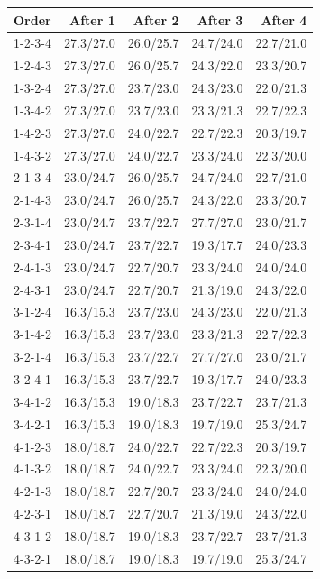 \begin{tabular}{lrrrr}
\toprule
Order & After 1 & After 2 & After 3 & After 4 \\
\midrule
1-2-3-4 & 27.3/27.0 & 26.0/25.7 & 24.7/24.0 & 22.7/21.0 \\
1-2-4-3 & 27.3/27.0 & 26.0/25.7 & 24.3/22.0 & 23.3/20.7 \\
1-3-2-4 & 27.3/27.0 & 23.7/23.0 & 24.3/23.0 & 22.0/21.3 \\
1-3-4-2 & 27.3/27.0 & 23.7/23.0 & 23.3/21.3 & 22.7/22.3 \\
1-4-2-3 & 27.3/27.0 & 24.0/22.7 & 22.7/22.3 & 20.3/19.7 \\
1-4-3-2 & 27.3/27.0 & 24.0/22.7 & 23.3/24.0 & 22.3/20.0 \\
2-1-3-4 & 23.0/24.7 & 26.0/25.7 & 24.7/24.0 & 22.7/21.0 \\
2-1-4-3 & 23.0/24.7 & 26.0/25.7 & 24.3/22.0 & 23.3/20.7 \\
2-3-1-4 & 23.0/24.7 & 23.7/22.7 & 27.7/27.0 & 23.0/21.7 \\
2-3-4-1 & 23.0/24.7 & 23.7/22.7 & 19.3/17.7 & 24.0/23.3 \\
2-4-1-3 & 23.0/24.7 & 22.7/20.7 & 23.3/24.0 & 24.0/24.0 \\
2-4-3-1 & 23.0/24.7 & 22.7/20.7 & 21.3/19.0 & 24.3/22.0 \\
3-1-2-4 & 16.3/15.3 & 23.7/23.0 & 24.3/23.0 & 22.0/21.3 \\
3-1-4-2 & 16.3/15.3 & 23.7/23.0 & 23.3/21.3 & 22.7/22.3 \\
3-2-1-4 & 16.3/15.3 & 23.7/22.7 & 27.7/27.0 & 23.0/21.7 \\
3-2-4-1 & 16.3/15.3 & 23.7/22.7 & 19.3/17.7 & 24.0/23.3 \\
3-4-1-2 & 16.3/15.3 & 19.0/18.3 & 23.7/22.7 & 23.7/21.3 \\
3-4-2-1 & 16.3/15.3 & 19.0/18.3 & 19.7/19.0 & 25.3/24.7 \\
4-1-2-3 & 18.0/18.7 & 24.0/22.7 & 22.7/22.3 & 20.3/19.7 \\
4-1-3-2 & 18.0/18.7 & 24.0/22.7 & 23.3/24.0 & 22.3/20.0 \\
4-2-1-3 & 18.0/18.7 & 22.7/20.7 & 23.3/24.0 & 24.0/24.0 \\
4-2-3-1 & 18.0/18.7 & 22.7/20.7 & 21.3/19.0 & 24.3/22.0 \\
4-3-1-2 & 18.0/18.7 & 19.0/18.3 & 23.7/22.7 & 23.7/21.3 \\
4-3-2-1 & 18.0/18.7 & 19.0/18.3 & 19.7/19.0 & 25.3/24.7 \\
\bottomrule
\end{tabular}
